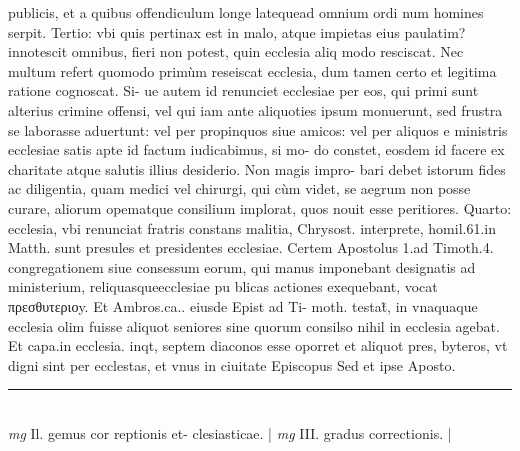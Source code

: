 \documentclass{article}
\begin{document}
\begin{pages}
publicis, et a quibus offendiculum longe latequead omnium ordi num homines serpit. Tertio: vbi quis pertinax est in malo, atque  impietas eius paulatim? innotescit omnibus, fieri non potest, quin ecclesia aliq modo resciscat. Nec multum refert quomodo primùm reseiscat ecclesia, dum tamen certo et legitima ratione cognoscat. Si- ue autem id renunciet ecclesiae per eos, qui primi sunt alterius crimine offensi, vel qui iam ante aliquoties ipsum monuerunt, sed frustra se laborasse aduertunt: vel per propinquos siue amicos: vel per aliquos e ministris ecclesiae satis apte id factum iudicabimus, si mo- do constet, eosdem id facere ex charitate atque  salutis illius desiderio. Non magis impro- bari debet istorum fides ac diligentia, quam medici vel chirurgi, qui cùm videt, se aegrum non posse curare, aliorum opematque  consilium implorat, quos nouit esse peritiores. Quarto: ecclesia, vbi renunciat fratris constans malitia, Chrysost. interprete, homil.61.in Matth. sunt presules et presidentes ecclesiae. Certem Apostolus 1.ad Timoth.4. congregationem siue consessum eorum, qui manus imponebant designatis ad ministerium, reliquasqueecclesiae pu blicas actiones exequebant, vocat πρεσθυτεριοy. Et Ambros.ca.. eiusde Epist ad Ti- moth. testat̃, in vnaquaque  ecclesia olim fuisse aliquot seniores sine quorum consilso nihil in ecclesia agebat. Et capa.in ecclesia. inqt, septem diaconos esse oporret et aliquot pres, byteros, vt digni sint per ecclestas, et vnus in ciuitate Episcopus Sed et ipse Aposto.  \pend
\vspace{0.5cm}\noindent
\vspace{0.2cm}\rule{1cm}{0.2pt}\\ 
\hspace{0.2cm}\textit{mg}
\footnotesize Il. gemus cor reptionis et- clesiasticae. 
\normalsize| 
\hspace{0.2cm}\textit{mg}
\footnotesize III. gradus correctionis. 
\normalsize| 

\end{pages}
\end{document}
